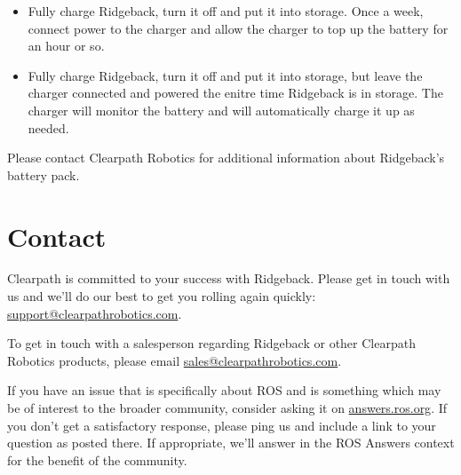 \documentclass[]{clearpath-latex/clearpath-manual}
\begin{document}
\begin{itemize}[nolistsep]
	\item Fully charge Ridgeback, turn it off and put it into storage.  Once a week, connect power to the charger and allow the charger to top up the battery for an hour or so. 
	\item Fully charge Ridgeback, turn it off and put it into storage, but leave the charger connected and powered the enitre time Ridgeback is in storage.  The charger will monitor the battery and will automatically charge it up as needed.
\end{itemize}


Please contact Clearpath Robotics for additional information about Ridgeback's battery pack.


%
%
%
%
%

\section{Contact}
\label{contact}

Clearpath is committed to your success with Ridgeback. Please get in touch with us and we’ll do our best to get
you rolling again quickly: \url{support@clearpathrobotics.com}.

To get in touch with a salesperson regarding Ridgeback or other Clearpath Robotics products, please email
\url{sales@clearpathrobotics.com}.

If you have an issue that is specifically about ROS and is something which may be of interest to the broader
community, consider asking it on \url{answers.ros.org}. If you don’t get a satisfactory response, please ping us and
include a link to your question as posted there. If appropriate, we’ll answer in the ROS Answers context for
the benefit of the community.
\end{document}
